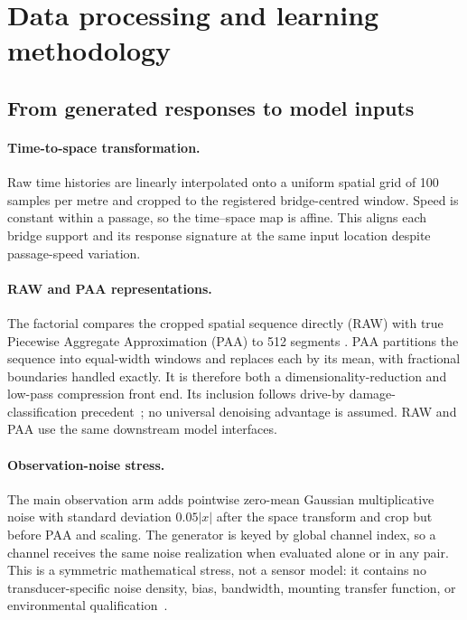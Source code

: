 \section{Data processing and learning methodology}
\label{sec:data_processing}

\subsection{From generated responses to model inputs}
\label{sec:preprocessing}

\paragraph{Time-to-space transformation.}
Raw time histories are linearly interpolated onto a uniform spatial grid of
100 samples per metre and cropped to the registered bridge-centred window.
Speed is constant within a passage, so the time--space map is affine. This
aligns each bridge support and its response signature at the same input
location despite passage-speed variation.

\paragraph{RAW and PAA representations.}
The factorial compares the cropped spatial sequence directly (RAW) with true
Piecewise Aggregate Approximation (PAA) to 512 segments
\cite{keogh2001dimensionality}. PAA partitions the sequence into equal-width
windows and replaces each by its mean, with fractional boundaries handled
exactly. It is therefore both a dimensionality-reduction and low-pass
compression front end. Its inclusion follows drive-by damage-classification
precedent~\cite{fernandes2025early}; no universal denoising advantage is
assumed. RAW and PAA use the same downstream model interfaces.

\paragraph{Observation-noise stress.}
The main observation arm adds pointwise zero-mean Gaussian multiplicative
noise with standard deviation $0.05|x|$ after the space transform and crop but
before PAA and scaling. The generator is keyed by global channel index, so a
channel receives the same noise realization when evaluated alone or in any
pair. This is a symmetric mathematical stress, not a sensor model: it contains
no transducer-specific noise density, bias, bandwidth, mounting transfer
function, or environmental qualification~\cite{en61373}.

